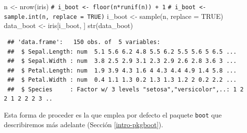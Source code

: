 \documentclass[
]{book}
\newenvironment{Shaded}{\begin{snugshade}}{\end{snugshade}}
\newcommand{\AttributeTok}[1]{\textcolor[rgb]{0.77,0.63,0.00}{#1}}
\newcommand{\CommentTok}[1]{\textcolor[rgb]{0.56,0.35,0.01}{\textit{#1}}}
\newcommand{\ConstantTok}[1]{\textcolor[rgb]{0.00,0.00,0.00}{#1}}
\newcommand{\FunctionTok}[1]{\textcolor[rgb]{0.00,0.00,0.00}{#1}}
\newcommand{\NormalTok}[1]{#1}
\newcommand{\OtherTok}[1]{\textcolor[rgb]{0.56,0.35,0.01}{#1}}
\theoremstyle{break}
\theoremstyle{nonumberplain}
\renewcommand{\CommentTok}[1]{\textcolor[rgb]{0.41,0.41,0.41}{\texttt{#1}}}
\begin{document}
\begin{Shaded}
\begin{Highlighting}[]
\NormalTok{n }\OtherTok{\textless{}{-}} \FunctionTok{nrow}\NormalTok{(iris)}
\CommentTok{\# i\_boot \textless{}{-} floor(n*runif(n)) + 1}
\CommentTok{\# i\_boot \textless{}{-} sample.int(n, replace = TRUE)}
\NormalTok{i\_boot }\OtherTok{\textless{}{-}} \FunctionTok{sample}\NormalTok{(n, }\AttributeTok{replace =} \ConstantTok{TRUE}\NormalTok{)}
\NormalTok{data\_boot }\OtherTok{\textless{}{-}}\NormalTok{ iris[i\_boot, ]}
\FunctionTok{str}\NormalTok{(data\_boot)}
\end{Highlighting}
\end{Shaded}

\begin{verbatim}
 ## 'data.frame':   150 obs. of  5 variables:
 ##  $ Sepal.Length: num  5.1 5.6 6.2 4.8 5.5 6.2 5.5 5.6 5 6.5 ...
 ##  $ Sepal.Width : num  3.8 2.5 2.9 3.1 2.3 2.9 2.6 2.8 3.6 3 ...
 ##  $ Petal.Length: num  1.9 3.9 4.3 1.6 4 4.3 4.4 4.9 1.4 5.8 ...
 ##  $ Petal.Width : num  0.4 1.1 1.3 0.2 1.3 1.3 1.2 2 0.2 2.2 ...
 ##  $ Species     : Factor w/ 3 levels "setosa","versicolor",..: 1 2 2 1 2 2 2 3 ..
\end{verbatim}

Esta forma de proceder es la que emplea por defecto el paquete \texttt{boot} que describiremos más adelante (Sección \ref{intro-pkgboot}).
\end{document}
